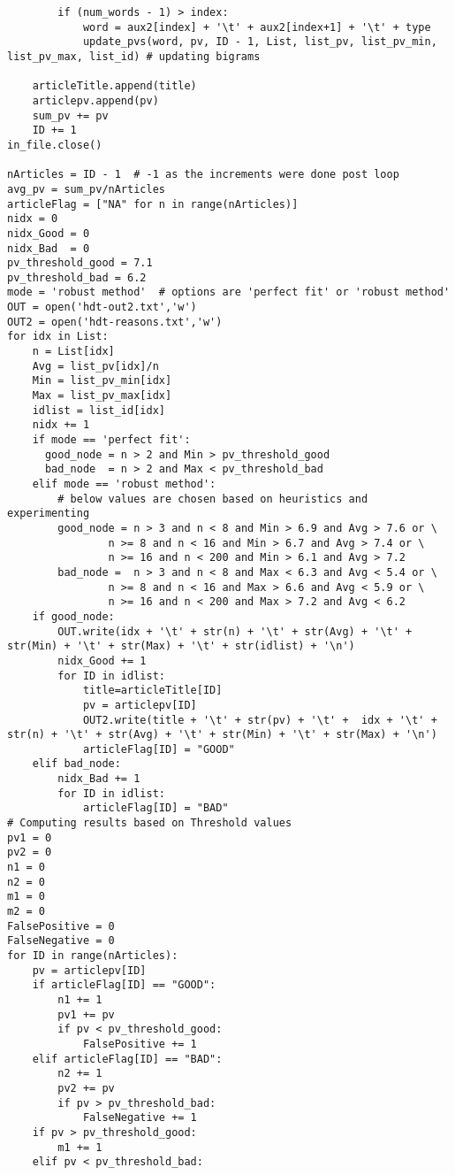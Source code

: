 \documentclass[oneside,10pt]{book}
\begin{document}
\begin{lstlisting}
        if (num_words - 1) > index:
            word = aux2[index] + '\t' + aux2[index+1] + '\t' + type
            update_pvs(word, pv, ID - 1, List, list_pv, list_pv_min, list_pv_max, list_id) # updating bigrams

    articleTitle.append(title)
    articlepv.append(pv)
    sum_pv += pv
    ID += 1
in_file.close()

nArticles = ID - 1  # -1 as the increments were done post loop
avg_pv = sum_pv/nArticles
articleFlag = ["NA" for n in range(nArticles)]
nidx = 0
nidx_Good = 0
nidx_Bad  = 0
pv_threshold_good = 7.1
pv_threshold_bad = 6.2
mode = 'robust method'  # options are 'perfect fit' or 'robust method'
OUT = open('hdt-out2.txt','w')
OUT2 = open('hdt-reasons.txt','w')
for idx in List:
    n = List[idx]
    Avg = list_pv[idx]/n
    Min = list_pv_min[idx]
    Max = list_pv_max[idx]
    idlist = list_id[idx]
    nidx += 1
    if mode == 'perfect fit':
      good_node = n > 2 and Min > pv_threshold_good
      bad_node  = n > 2 and Max < pv_threshold_bad
    elif mode == 'robust method':
        # below values are chosen based on heuristics and experimenting
        good_node = n > 3 and n < 8 and Min > 6.9 and Avg > 7.6 or \
                n >= 8 and n < 16 and Min > 6.7 and Avg > 7.4 or \
                n >= 16 and n < 200 and Min > 6.1 and Avg > 7.2
        bad_node =  n > 3 and n < 8 and Max < 6.3 and Avg < 5.4 or \
                n >= 8 and n < 16 and Max > 6.6 and Avg < 5.9 or \
                n >= 16 and n < 200 and Max > 7.2 and Avg < 6.2
    if good_node:
        OUT.write(idx + '\t' + str(n) + '\t' + str(Avg) + '\t' + str(Min) + '\t' + str(Max) + '\t' + str(idlist) + '\n')
        nidx_Good += 1
        for ID in idlist:
            title=articleTitle[ID]
            pv = articlepv[ID]
            OUT2.write(title + '\t' + str(pv) + '\t' +  idx + '\t' + str(n) + '\t' + str(Avg) + '\t' + str(Min) + '\t' + str(Max) + '\n')
            articleFlag[ID] = "GOOD"
    elif bad_node:
        nidx_Bad += 1
        for ID in idlist:
            articleFlag[ID] = "BAD"
# Computing results based on Threshold values
pv1 = 0
pv2 = 0
n1 = 0
n2 = 0
m1 = 0
m2 = 0
FalsePositive = 0
FalseNegative = 0
for ID in range(nArticles):
    pv = articlepv[ID]
    if articleFlag[ID] == "GOOD":
        n1 += 1
        pv1 += pv
        if pv < pv_threshold_good:
            FalsePositive += 1
    elif articleFlag[ID] == "BAD":
        n2 += 1
        pv2 += pv
        if pv > pv_threshold_bad:
            FalseNegative += 1
    if pv > pv_threshold_good:
        m1 += 1
    elif pv < pv_threshold_bad:

\end{lstlisting}
\end{document}

